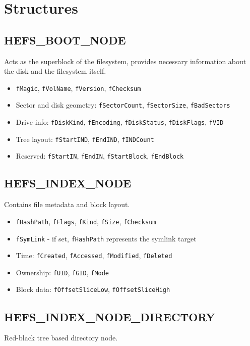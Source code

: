 \documentclass{article}
\begin{document}
\section{Structures}\label{sec:structures}

\subsection{HEFS\_BOOT\_NODE}\label{subsec:hefs_boot_node}
Acts as the superblock of the filesystem, provides necessary information about the disk and the filesystem itself.

\begin{itemize}
  \item \texttt{fMagic}, \texttt{fVolName}, \texttt{fVersion}, \texttt{fChecksum}
  \item Sector and disk geometry: \texttt{fSectorCount}, \texttt{fSectorSize}, \texttt{fBadSectors}
  \item Drive info: \texttt{fDiskKind}, \texttt{fEncoding}, \texttt{fDiskStatus}, \texttt{fDiskFlags}, \texttt{fVID}
  \item Tree layout: \texttt{fStartIND}, \texttt{fEndIND}, \texttt{fINDCount}
  \item Reserved: \texttt{fStartIN}, \texttt{fEndIN}, \texttt{fStartBlock}, \texttt{fEndBlock}
\end{itemize}

\subsection{HEFS\_INDEX\_NODE}\label{subsec:hefs_index_node}
Contains file metadata and block layout.

\begin{itemize}
  \item \texttt{fHashPath}, \texttt{fFlags}, \texttt{fKind}, \texttt{fSize}, \texttt{fChecksum}
  \item \texttt{fSymLink} - if set, \texttt{fHashPath} represents the symlink target
  \item Time: \texttt{fCreated}, \texttt{fAccessed}, \texttt{fModified}, \texttt{fDeleted}
  \item Ownership: \texttt{fUID}, \texttt{fGID}, \texttt{fMode}
  \item Block data: \texttt{fOffsetSliceLow}, \texttt{fOffsetSliceHigh}
\end{itemize}

\subsection{HEFS\_INDEX\_NODE\_DIRECTORY}\label{subsec:hefs_index_node_directory}
Red-black tree based directory node.
\end{document}
